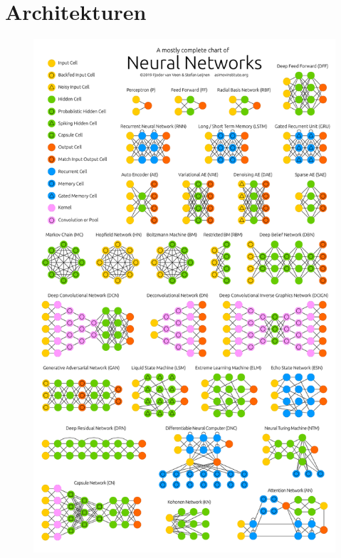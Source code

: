\section{Architekturen}

\begin{figure}[!htb]
	\centering
	\includegraphics[width=.7\linewidth]{img/architektur_uebersicht}
	\label{fig:arch_arten}
\end{figure}
